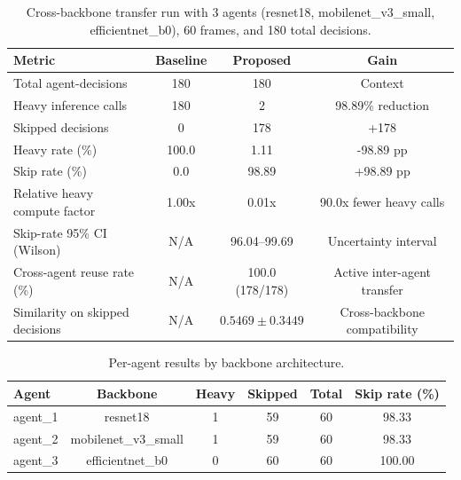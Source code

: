 
\begin{table}[t]
\centering
\caption{Cross-backbone transfer run with 3 agents (resnet18, mobilenet\_v3\_small, efficientnet\_b0), 60 frames, and 180 total decisions.}
\label{tab:cross_backbone_main}
\begin{tabular}{lccc}
\toprule
Metric & Baseline & Proposed & Gain \\
\midrule
Total agent-decisions & 180 & 180 & Context \\
Heavy inference calls & 180 & 2 & 98.89\% reduction \\
Skipped decisions & 0 & 178 & +178 \\
Heavy rate (\%) & 100.0 & 1.11 & -98.89 pp \\
Skip rate (\%) & 0.0 & 98.89 & +98.89 pp \\
Relative heavy compute factor & 1.00x & 0.01x & 90.0x fewer heavy calls \\
Skip-rate 95\% CI (Wilson) & N/A & 96.04--99.69 & Uncertainty interval \\
Cross-agent reuse rate (\%) & N/A & 100.0 (178/178) & Active inter-agent transfer \\
Similarity on skipped decisions & N/A & $0.5469 \pm 0.3449$ & Cross-backbone compatibility \\
\bottomrule
\end{tabular}
\end{table}

\begin{table}[t]
\centering
\caption{Per-agent results by backbone architecture.}
\label{tab:cross_backbone_per_agent}
\begin{tabular}{lccccc}
\toprule
Agent & Backbone & Heavy & Skipped & Total & Skip rate (\%) \\
\midrule
agent\_1 & resnet18 & 1 & 59 & 60 & 98.33 \\
agent\_2 & mobilenet\_v3\_small & 1 & 59 & 60 & 98.33 \\
agent\_3 & efficientnet\_b0 & 0 & 60 & 60 & 100.00 \\
\bottomrule
\end{tabular}
\end{table}

